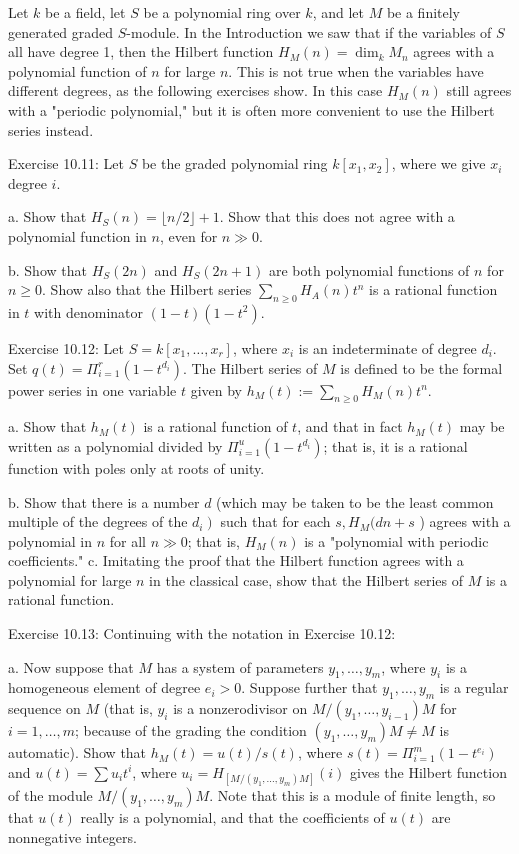 \documentclass[10pt, letterpaper]{article}
\begin{document}
Let $k$ be a field, let $S$ be a polynomial ring over $k$, and let $M$ be a finitely generated graded $S$-module. In the Introduction we saw that if the variables of $S$ all have degree 1, then the Hilbert function $H_M(n)=\operatorname{dim}_k M_n$ agrees with a polynomial function of $n$ for large $n$. This is not true when the variables have different degrees, as the following exercises show. In this case $H_M(n)$ still agrees with a "periodic polynomial," but it is often more convenient to use the Hilbert series instead.

Exercise 10.11: Let $S$ be the graded polynomial ring $k\left[x_1, x_2\right]$, where we give $x_i$ degree $i$.

a. Show that $H_S(n)=\lfloor n / 2\rfloor+1$. Show that this does not agree with a polynomial function in $n$, even for $n \gg 0$.

b. Show that $H_S(2 n)$ and $H_S(2 n+1)$ are both polynomial functions of $n$ for $n \geq 0$. Show also that the Hilbert series $\sum_{n \geq 0} H_A(n) t^n$ is a rational function in $t$ with denominator $(1-t)\left(1-t^2\right)$.

Exercise 10.12: Let $S=k\left[x_1, \ldots, x_r\right]$, where $x_i$ is an indeterminate of degree $d_i$. Set $q(t)=\Pi_{i=1}^r\left(1-t^{d_i}\right)$. The Hilbert series of $M$ is defined to be the formal power series in one variable $t$ given by $h_M(t):=\sum_{n \geq 0} H_M(n) t^n$.

a. Show that $h_M(t)$ is a rational function of $t$, and that in fact $h_M(t)$ may be written as a polynomial divided by $\Pi_{i=1}^u\left(1-t^{d_i}\right)$; that is, it is a rational function with poles only at roots of unity.

b. Show that there is a number $d$ (which may be taken to be the least common multiple of the degrees of the $\left.d_i\right)$ such that for each $s, H_M(d n+ s$ ) agrees with a polynomial in $n$ for all $n \gg 0$; that is, $H_M(n)$ is a "polynomial with periodic coefficients."
c. Imitating the proof that the Hilbert function agrees with a polynomial for large $n$ in the classical case, show that the Hilbert series of $M$ is a rational function.

Exercise 10.13: Continuing with the notation in Exercise 10.12:

a. Now suppose that $M$ has a system of parameters $y_1, \ldots, y_m$, where $y_i$ is a homogeneous element of degree $e_i>0$. Suppose further that $y_1, \ldots, y_m$ is a regular sequence on $M$ (that is, $y_i$ is a nonzerodivisor on $M /\left(y_1, \ldots, y_{i-1}\right) M$ for $i=1, \ldots, m$; because of the grading the condition $\left(y_1, \ldots, y_m\right) M \neq M$ is automatic). Show that $h_M(t)=u(t) / s(t)$, where $s(t)=\Pi_{i=1}^m\left(1-t^{e_i}\right)$ and $u(t)=\sum u_i t^i$, where $u_i=H_{\left[M /\left(y_1, \ldots, y_m\right) M\right]}(i)$ gives the Hilbert function of the module $M /\left(y_1, \ldots, y_m\right) M$. Note that this is a module of finite length, so that $u(t)$ really is a polynomial, and that the coefficients of $u(t)$ are nonnegative integers.
\end{document}
